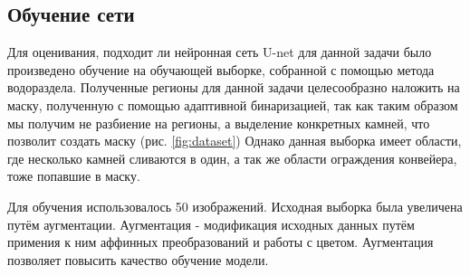 \documentclass[times]{itmo-student-thesis}
\begin{document}
\subsection{Обучение сети}
Для оценивания, подходит ли нейронная сеть U-net для данной задачи было произведено обучение на обучающей выборке,  собранной с помощью метода водораздела. Полученные регионы для данной задачи целесообразно наложить на маску, полученную с помощью адаптивной бинаризацией, так как таким образом мы получим не разбиение на регионы, а выделение конкретных камней, что позволит создать маску (рис. \ref{fig:dataset}) Однако данная выборка имеет области, где несколько камней сливаются в один, а так же области ограждения конвейера, тоже попавшие в маску.

Для обучения использовалось 50 изображений. Исходная выборка была увеличена путём аугментации\cite{dataaug}. Аугментация - модификация исходных данных путём примения к ним аффинных преобразований и работы с цветом. Аугментация позволяет повысить качество обучение модели. 
\end{document}
